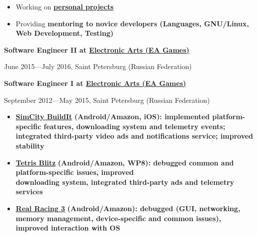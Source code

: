 \begin{itemize}[rightmargin=\dimexpr\linewidth-18cm-\leftmargin\relax]
    \item Working on \bfseries \href{https://alopatindev.github.io/projects/}{personal projects}\mdseries
    \item Providing \bfseries mentoring \mdseries to novice developers (Languages, GNU/Linux, Web Development, Testing)
\end{itemize}

\vspace{0.5cm}

{
\fontsize{12pt}{12pt}\selectfont
\bfseries Software Engineer II at
\href{http://www.ea.com}{Electronic Arts (EA Games)}
\mdseries
}

{
\fontsize{9pt}{8pt}\selectfont
June 2015---July 2016, Saint Petersburg (Russian Federation)
}


\vspace{0.2cm}

{
\fontsize{12pt}{12pt}\selectfont
\bfseries Software Engineer I at
\href{http://www.ea.com}{Electronic Arts (EA Games)}
\mdseries
}

{
\fontsize{9pt}{8pt}\selectfont
September 2012---May 2015, Saint Petersburg (Russian Federation)
}

\vspace{0.2cm}

\begin{itemize}[rightmargin=\dimexpr\linewidth-18cm-\leftmargin\relax]
\item
    \href{http://www.ea.com/simcity-buildit}
        {\bfseries SimCity BuildIt\mdseries}
        \bfseries (Android/Amazon, iOS)\mdseries:
        implemented platform-specific features,
        downloading system
        and telemetry events;
        integrated third-party video ads and notifications service;
        improved stability
\item
    \href{http://www.tetrisblitz.com}
        {\bfseries Tetris Blitz\mdseries}
        \bfseries(Android/Amazon, WP8)\mdseries:
        debugged common and platform-specific issues,
        improved \\ downloading system,
        integrated third-party ads and telemetry services
\item
    \href{http://www.ea.com/real-racing-3}
        {\bfseries Real Racing 3\mdseries}
        \bfseries (Android/Amazon)\mdseries:
        debugged (GUI, networking, memory management, device-specific and common issues),
        improved interaction with OS
\end{itemize}

